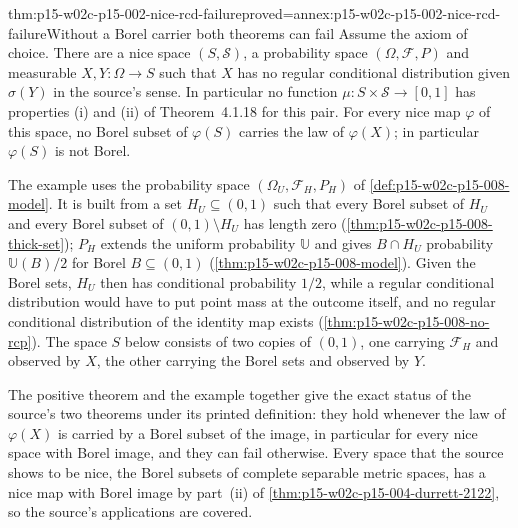 \begin{hbtheorem}{thm:p15-w02c-p15-002-nice-rcd-failure}{proved=annex:p15-w02c-p15-002-nice-rcd-failure}{Without a Borel carrier both theorems can fail}
Assume the axiom of choice. There are a nice space \((S,\mathcal S)\), a
probability space \((\Omega,\mathcal F,P)\) and measurable
\(X,Y:\Omega\to S\) such that \(X\) has no regular conditional
distribution given \(\sigma(Y)\) in the source's sense. In particular no
function \(\mu:S\times\mathcal S\to[0,1]\) has properties (i) and (ii) of
Theorem~4.1.18 for this pair. For every nice map \(\varphi\) of this space,
no Borel subset of \(\varphi(S)\) carries the law of \(\varphi(X)\); in
particular \(\varphi(S)\) is not Borel.
\end{hbtheorem}

The example uses the probability space \((\Omega_U,\mathcal F_H,P_H)\) of
\cref{def:p15-w02c-p15-008-model}. It is built from a set
\(H_U\subseteq(0,1)\) such that every Borel subset of \(H_U\) and every
Borel subset of \((0,1)\setminus H_U\) has length zero
(\cref{thm:p15-w02c-p15-008-thick-set}); \(P_H\) extends the uniform
probability \(\mathbb U\) and gives \(B\cap H_U\) probability
\(\mathbb U(B)/2\) for Borel \(B\subseteq(0,1)\)
(\cref{thm:p15-w02c-p15-008-model}). Given the Borel sets, \(H_U\) then
has conditional probability \(1/2\), while a regular conditional
distribution would have to put point mass at the outcome itself, and no
regular conditional distribution of the identity map exists
(\cref{thm:p15-w02c-p15-008-no-rcp}). The space \(S\) below consists of two
copies of \((0,1)\), one carrying \(\mathcal F_H\) and observed by \(X\),
the other carrying the Borel sets and observed by \(Y\).

The positive theorem and the example together give the exact status of the
source's two theorems under its printed definition: they hold whenever
the law of \(\varphi(X)\) is carried by a Borel subset of the image, in
particular for every nice space with Borel image, and they can fail
otherwise. Every space that the source shows to be nice, the Borel subsets
of complete separable metric spaces, has a nice map with Borel image by
part~(ii) of \cref{thm:p15-w02c-p15-004-durrett-2122}, so the source's applications are
covered.
